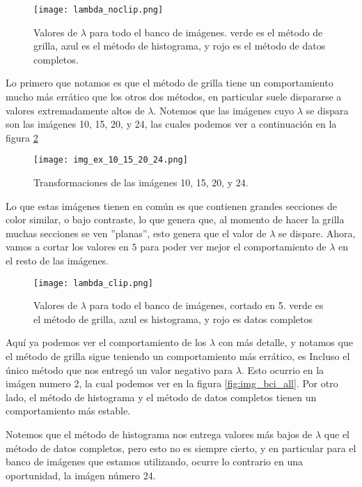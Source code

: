     \begin{figure}[H]
        \centering
        \texttt{[image: lambda\_noclip.png]}
        \caption{Valores de $\lambda$ para todo el banco de im\'agenes. verde es el m\'etodo de grilla, azul es el m\'etodo de histograma, y rojo es el m\'etodo de datos completos.}
        \label{fig:lambda_noclip}
    \end{figure}

    Lo primero que notamos es que el m\'etodo de grilla tiene un comportamiento mucho m\'as err\'atico que los otros dos m\'etodos, en particular suele dispararse a valores extremadamente altos de $\lambda$. Notemos que las im\'agenes cuyo $\lambda$ se dispara son las im\'agenes 10, 15, 20, y 24, las cuales podemos ver a continuaci\'on en la figura \ref{fig:img_bci_10_15_20}

    \begin{figure}[H]
        \centering
        \texttt{[image: img\_ex\_10\_15\_20\_24.png]}
        \caption{Transformaciones de las im\'agenes 10, 15, 20, y 24.}
        \label{fig:img_bci_10_15_20}
    \end{figure}

    Lo que estas im\'agenes tienen en com\'un es que contienen grandes secciones de color similar, o bajo contraste, lo que genera que, al momento de hacer la grilla muchas secciones se ven ''planas'', esto genera que el valor de $\lambda$ se dispare. Ahora, vamos a cortar los valores en $5$ para poder ver mejor el comportamiento de $\lambda$ en el resto de las im\'agenes.

    \begin{figure}[H]
        \centering
        \texttt{[image: lambda\_clip.png]}
        \caption{Valores de $\lambda$ para todo el banco de im\'agenes, cortado en 5. verde es el m\'etodo de grilla, azul es histograma, y rojo es datos completos}
        \label{fig:lambda_clip}
    \end{figure}

    Aqu\'i ya podemos ver el comportamiento de los $\lambda$ con m\'as detalle, y notamos que el m\'etodo de grilla sigue teniendo un comportamiento m\'as err\'atico, es Incluso el \'unico m\'etodo que nos entreg\'o un valor negativo para $\lambda$. Esto ocurrio en la im\'agen numero 2, la cual podemos ver en la figura \ref{fig:img_bci_all}. Por otro lado, el m\'etodo de histograma y el m\'etodo de datos completos tienen un comportamiento m\'as estable. 
    
    Notemos que el m\'etodo de histograma nos entrega valores m\'as bajos de $\lambda$ que el m\'etodo de datos completos, pero esto no es siempre cierto, y en particular para el banco de im\'agenes que estamos utilizando, ocurre lo contrario en una oportunidad, la im\'agen n\'umero 24.

